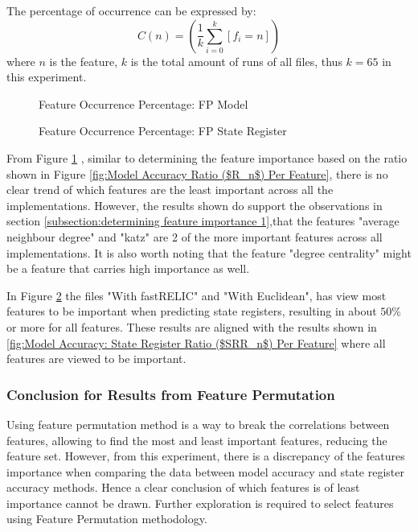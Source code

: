 \documentclass{tum-book}
\begin{document}
        \noindent
        The percentage of occurrence can be expressed by:
                \begin{equation}
                    \label{eqn:percentage of feature occurrence}
                    C(n)=(\frac{1}{k}\sum_{i=0}^{k} {[f_i = n]})
                \end{equation}
        \bigskip\noindent
        where $n$ is the feature, $k$ is the total amount of runs of all files, thus $k=65$ in this experiment.
        
        \begin{figure}[hb]
        \centering
            
            \caption{Feature Occurrence Percentage: FP Model}
            \label{fig:Feature Occurrence Percentage: FP Model}
        \end{figure}
        
        \newpage\begin{figure}[ht]
            
            \caption{Feature Occurrence Percentage: FP State Register}
            \label{fig:Feature Occurrence Percentage: FP State Register}
        \end{figure}
        
        \noindent
        From Figure \ref{fig:Feature Occurrence Percentage: FP Model} , similar to determining the feature importance based on the ratio shown in Figure \ref{fig:Model Accuracy Ratio ($R_n$) Per Feature}, there is no clear trend of which features are the least important across all the implementations. However, the results shown do support the observations in section \ref{subsection:determining feature importance 1},that the features "average neighbour degree" and "katz" are 2 of the more important features across all implementations. It is also worth noting that the feature "degree centrality" might be a feature that carries high importance as well. 
        
        \bigskip\noindent 
        In Figure \ref{fig:Feature Occurrence Percentage: FP State Register} the files "With fastRELIC" and "With Euclidean", has view most features to be important when predicting state registers, resulting in about $50\%$ or more for all features. These results are aligned with the results shown in \ref{fig:Model Accuracy: State Register Ratio ($SRR_n$) Per Feature} where all features are viewed to be important.
        
        \subsubsection{Conclusion for Results from Feature Permutation}
        Using feature permutation method is a way to break the correlations between features, allowing to find the most and least important features, reducing the feature set. However, from this experiment, there is a discrepancy of the features importance when comparing the data between model accuracy and state register accuracy methods. Hence a clear conclusion of which features is of least importance cannot be drawn. Further exploration is required to select features using Feature Permutation methodology.
        
\end{document}

